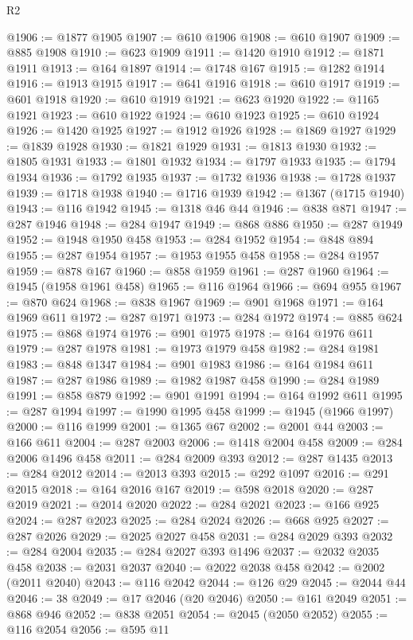 \begin{lexlean}{R2}
\begin{coremodule}
@1906 := @1877 @1905
@1907 := @610 @1906
@1908 := @610 @1907
@1909 := @885 @1908
@1910 := @623 @1909
@1911 := @1420 @1910
@1912 := @1871 @1911
@1913 := @164 @1897
@1914 := @1748 @167
@1915 := @1282 @1914
@1916 := @1913 @1915
@1917 := @641 @1916
@1918 := @610 @1917
@1919 := @601 @1918
@1920 := @610 @1919
@1921 := @623 @1920
@1922 := @1165 @1921
@1923 := @610 @1922
@1924 := @610 @1923
@1925 := @610 @1924
@1926 := @1420 @1925
@1927 := @1912 @1926
@1928 := @1869 @1927
@1929 := @1839 @1928
@1930 := @1821 @1929
@1931 := @1813 @1930
@1932 := @1805 @1931
@1933 := @1801 @1932
@1934 := @1797 @1933
@1935 := @1794 @1934
@1936 := @1792 @1935
@1937 := @1732 @1936
@1938 := @1728 @1937
@1939 := @1718 @1938
@1940 := @1716 @1939
@1942 := @1367 (@1715 @1940)
@1943 := @116 @1942
@1945 := @1318 @46 @44
@1946 := @838 @871
@1947 := @287 @1946
@1948 := @284 @1947
@1949 := @868 @886
@1950 := @287 @1949
@1952 := @1948 @1950 @458
@1953 := @284 @1952
@1954 := @848 @894
@1955 := @287 @1954
@1957 := @1953 @1955 @458
@1958 := @284 @1957
@1959 := @878 @167
@1960 := @858 @1959
@1961 := @287 @1960
@1964 := @1945 (@1958 @1961 @458)
@1965 := @116 @1964
@1966 := @694 @955
@1967 := @870 @624
@1968 := @838 @1967
@1969 := @901 @1968
@1971 := @164 @1969 @611
@1972 := @287 @1971
@1973 := @284 @1972
@1974 := @885 @624
@1975 := @868 @1974
@1976 := @901 @1975
@1978 := @164 @1976 @611
@1979 := @287 @1978
@1981 := @1973 @1979 @458
@1982 := @284 @1981
@1983 := @848 @1347
@1984 := @901 @1983
@1986 := @164 @1984 @611
@1987 := @287 @1986
@1989 := @1982 @1987 @458
@1990 := @284 @1989
@1991 := @858 @879
@1992 := @901 @1991
@1994 := @164 @1992 @611
@1995 := @287 @1994
@1997 := @1990 @1995 @458
@1999 := @1945 (@1966 @1997)
@2000 := @116 @1999
@2001 := @1365 @67
@2002 := @2001 @44
@2003 := @166 @611
@2004 := @287 @2003
@2006 := @1418 @2004 @458
@2009 := @284 @2006 @1496 @458
@2011 := @284 @2009 @393
@2012 := @287 @1435
@2013 := @284 @2012
@2014 := @2013 @393
@2015 := @292 @1097
@2016 := @291 @2015
@2018 := @164 @2016 @167
@2019 := @598 @2018
@2020 := @287 @2019
@2021 := @2014 @2020
@2022 := @284 @2021
@2023 := @166 @925
@2024 := @287 @2023
@2025 := @284 @2024
@2026 := @668 @925
@2027 := @287 @2026
@2029 := @2025 @2027 @458
@2031 := @284 @2029 @393
@2032 := @284 @2004
@2035 := @284 @2027 @393 @1496
@2037 := @2032 @2035 @458
@2038 := @2031 @2037
@2040 := @2022 @2038 @458
@2042 := @2002 (@2011 @2040)
@2043 := @116 @2042
@2044 := @126 @29
@2045 := @2044 @44
@2046 := 38
@2049 := @17 @2046 (@20 @2046)
@2050 := @161 @2049
@2051 := @868 @946
@2052 := @838 @2051
@2054 := @2045 (@2050 @2052)
@2055 := @116 @2054
@2056 := @595 @11

\end{coremodule}
\end{lexlean}
